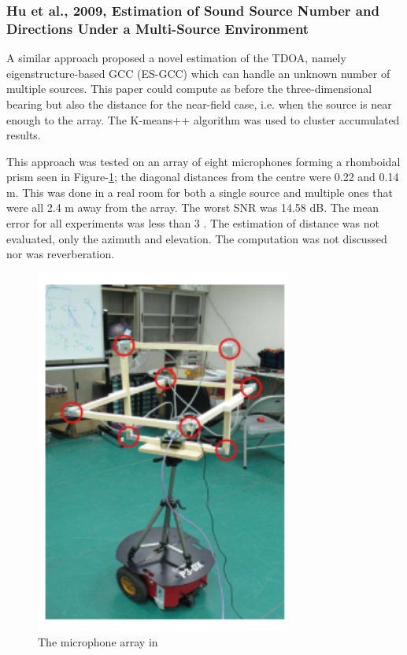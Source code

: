 \documentclass[notitlepage]{report}
\begin{document}
\subsubsection{Hu et al., 2009, Estimation of Sound Source Number and Directions Under a Multi-Source Environment}

A similar approach \cite{hu_estimation_2009} proposed a novel estimation of the TDOA, namely eigenstructure-based GCC (ES-GCC) which can handle an unknown number of multiple sources. This paper could compute as before the three-dimensional bearing but also the distance for the near-field case, i.e. when the source is near enough to the array. The K-means++ algorithm was used to cluster accumulated results. 

This approach was tested on an array of eight microphones forming a rhomboidal prism seen in Figure-\ref{fig:hu_2009_plot}; the diagonal distances from the centre were 0.22 and 0.14 \si{m}. This was done in a real room for both a single source and multiple ones that were all 2.4 \si{m} away from the array. The worst SNR was 14.58 \si{dB}. The mean error for all experiments was less than 3 \si{\deg}. The estimation of distance was not evaluated, only the azimuth and elevation. The computation was not discussed nor was reverberation.

\begin{figure}[H]
\includegraphics[width=0.75\textwidth]{./hu_2009/array.png}
\centering
\caption{The microphone array in \cite{hu_estimation_2009}}
\label{fig:hu_2009_plot}
\centering
\end{figure}
\end{document}
